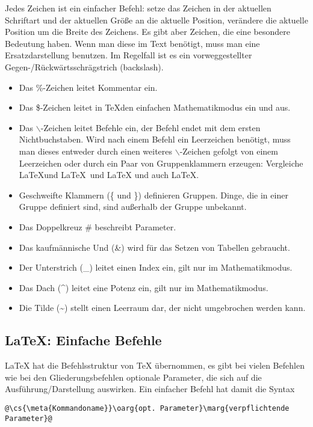 Jedes Zeichen ist ein einfacher Befehl: setze das Zeichen in der
aktuellen Schriftart und der aktuellen Größe an die aktuelle
Position, verändere die aktuelle Position um die Breite des Zeichens.
Es gibt aber Zeichen, die eine besondere Bedeutung haben. Wenn man
diese im Text benötigt, muss man eine Ersatzdarstellung benutzen. Im
Regelfall ist es ein vorweggestellter Gegen-/Rückwärtsschrägstrich
(backslash).
\begin{itemize}                 %
  \item Das \%-Zeichen leitet Kommentar ein.
  \item Das \$-Zeichen leitet in \TeX den einfachen Mathematikmodus ein und
    aus.
  \item Das \(\backslash\)-Zeichen leitet Befehle ein, der Befehl endet mit
    dem ersten Nichtbuchstaben. Wird nach einem Befehl ein Leerzeichen
    benötigt, muss man dieses entweder durch einen weiteres
    \(\backslash\)-Zeichen gefolgt von einem Leerzeichen oder durch ein
    Paar von Gruppenklammern erzeugen: Vergleiche \LaTeX und \LaTeX\ und
    \LaTeX{} und auch \LaTeX.
  \item Geschweifte Klammern (\{ und \}) definieren Gruppen. Dinge, die in
    einer Gruppe definiert sind, sind außerhalb der Gruppe unbekannt.
  \item Das Doppelkreuz \# beschreibt Parameter.
  \item Das kaufmännische Und (\&) wird für das Setzen von Tabellen
    gebraucht.
  \item Der Unterstrich (\_) leitet einen Index ein, gilt nur im
    Mathematikmodus.
  \item Das Dach (\^{}) leitet eine Potenz ein, gilt nur im
    Mathematikmodus.
  \item Die Tilde (\~{}) stellt einen Leerraum dar, der nicht umgebrochen
    werden kann.
\end{itemize}

\subsection{\LaTeX: Einfache Befehle}

\LaTeX{} hat die Befehlsstruktur von \TeX{} übernommen, es gibt bei vielen
Befehlen wie bei den Gliederungsbefehlen optionale Parameter, die sich auf
die Ausführung/Darstellung auswirken. Ein einfacher Befehl hat damit die
Syntax
\begin{lstlisting}[style=colored]
@\cs{\meta{Kommandoname}}\oarg{opt. Parameter}\marg{verpflichtende Parameter}@
\end{lstlisting}

